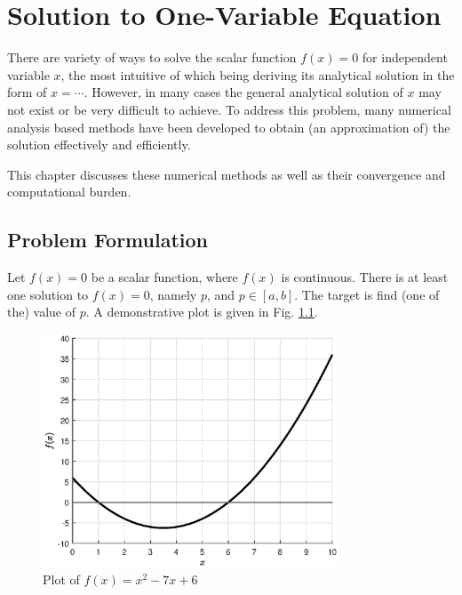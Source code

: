 \chapter{Solution to One-Variable Equation}

There are variety of ways to solve the scalar function $f(x)=0$ for independent variable $x$, the most intuitive of which being deriving its analytical solution in the form of $x=\cdots$. However, in many cases the general analytical solution of $x$ may not exist or be very difficult to achieve. To address this problem, many numerical analysis based methods have been developed to obtain (an approximation of) the solution effectively and efficiently.

This chapter discusses these numerical methods as well as their convergence and computational burden. 

\section{Problem Formulation}

Let $f(x)=0$ be a scalar function, where $f(x)$ is continuous. There is at least one solution to $f(x)=0$, namely $p$, and $p\in \left[a, b\right]$. The target is find (one of the) value of $p$. A demonstrative plot is given in Fig. \ref{fig:p5:onevarproblemformulation}.

\begin{figure}[htbp]
\centering
\includegraphics[width=250pt]{chapters/part5/figures/demo_problem_formulation.eps}
\caption{Plot of $f(x)=x^2-7x+6$} \label{fig:p5:onevarproblemformulation}
\end{figure} 